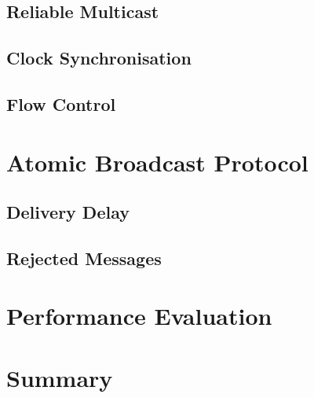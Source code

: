 	\subsection{Reliable Multicast}\label{ssec:rmcast}
	\subsection{Clock Synchronisation}\label{ssec:clocksynch}
	\subsection{Flow Control}\label{ssec:fcc}
	
\section{Atomic Broadcast Protocol}
	\subsection{Delivery Delay}
	\subsection{Rejected Messages}
	
\section{Performance Evaluation}
	
\section{Summary}